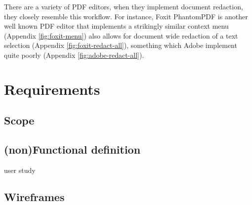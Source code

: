 \documentclass{l4proj}
\begin{document}
There are a variety of PDF editors, when they implement document redaction, they closely resemble this workflow. 
For instance, Foxit PhantomPDF is another well known PDF editor that implements a strikingly similar context menu (Appendix \ref{fig:foxit-menu}) also allows for document wide redaction of a text selection (Appendix \ref{fig:foxit-redact-all}), something which Adobe implement quite poorly (Appendix \ref{fig:adobe-redact-all}).

\chapter{Requirements}

\section{Scope}

\section{(non)Functional definition}

user study

\section{Wireframes}
\end{document}
